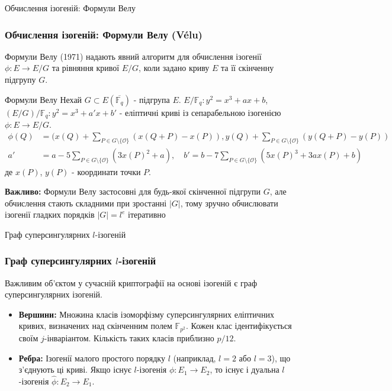 \documentclass[9pt]{beamer}
\begin{document}
\begin{darkframes}

\begin{frame}{Обчислення ізогеній: Формули Велу}
  \frametitle{Обчислення ізогеній: Формули Велу (Vélu)}
     Формули Велу (1971) надають явний алгоритм для обчислення ізогенії $\phi: E \to E/G$ та рівняння кривої $E/G$, коли задано криву $E$ та її скінченну підгрупу $G$.
    \begin{block}{Формули Велу}
        Нехай $G \subset E(\overline{\mathbb{F}_q})$ - підгрупа $E$. $E/\mathbb{F}_q: y^2=x^3 + ax +b$, $(E/G)/\mathbb{F}_q: y^2=x^3 + a'x +b'$ - еліптичні криві із сепарабельною ізогенією $\phi: E \to E/G$.
    \begin{align*} \phi(Q) &=( x(Q) + \sum_{P \in G \setminus \{\mathcal{O}\}} \left( x(Q+P) - x(P) \right), y(Q) + \sum_{P \in G \setminus \{\mathcal{O}\}} \left( y(Q+P) - y(P) \right) \\
    a'&=a-5\sum_{P \in G \setminus \{ \mathcal{O} \}} (3x(P)^2 + a), \quad b'= b-7\sum_{P \in G \setminus \{ \mathcal{O} \}} (5x(P)^3 + 3ax(P)+b)
    \end{align*}
    де $x(P)$, $y(P)$ - координати точки $P$.
    \end{block}
    \textbf{Важливо:} Формули Велу застосовні для будь-якої скінченної підгрупи $G$, але обчислення стають складними при зростанні $|G|$, тому зручно обчислювати ізогенії гладких порядків $|G|=l^e$ ітеративно
\end{frame}

\begin{frame}{Граф суперсингулярних $l$-ізогеній}
  \frametitle{Граф суперсингулярних $l$-ізогеній}
  Важливим об'єктом у сучасній криптографії на основі ізогеній є граф суперсингулярних ізогеній.

  \begin{itemize}
    \item \textbf{Вершини:} Множина класів ізоморфізму суперсингулярних еліптичних кривих, визначених над скінченним полем $\mathbb{F}_{p^2}$. Кожен клас ідентифікується своїм $j$-інваріантом. Кількість таких класів приблизно $p/12$.
    \item \textbf{Ребра:} Ізогенії малого простого порядку $l$ (наприклад, $l=2$ або $l=3$), що з'єднують ці криві. Якщо існує $l$-ізогенія $\phi: E_1 \to E_2$, то існує і дуальна $l$-ізогенія $\hat{\phi}: E_2 \to E_1$.
  \end{itemize}


\end{frame}
\end{darkframes}
\end{document}
